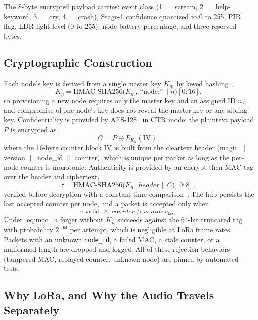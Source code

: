 \documentclass[journal]{IEEEtran}
\begin{document}
The 8-byte encrypted payload carries: event class (1~=~scream,
2~=~help-keyword, 3~=~cry, 4~=~crash), Stage-1 confidence quantized to
0 to 255, PIR flag, LDR light level (0 to 255), node battery percentage, and
three reserved bytes.

\subsection{Cryptographic Construction}

Each node's key is derived from a single master key $K_m$ by keyed
hashing~\cite{rfc2104},
\begin{equation}
\label{eq:keyderivation}
K_n = \mathrm{HMAC\text{-}SHA256}\bigl(K_m,\ \text{``node:''} \parallel
n\bigr)[0{:}16],
\end{equation}
so provisioning a new node requires only the master key and an assigned ID
$n$, and compromise of one node's key does not reveal the master key or any
sibling key. Confidentiality is provided by AES-128~\cite{fips197} in CTR
mode: the plaintext payload $P$ is encrypted as
\begin{equation}
\label{eq:ctr}
C = P \oplus E_{K_n}(\mathrm{IV}),
\end{equation}
where the 16-byte counter block IV is built from the cleartext header
(magic $\parallel$ version $\parallel$ node\_id $\parallel$ counter), which
is unique per packet as long as the per-node counter is monotonic.
Authenticity is provided by an encrypt-then-MAC tag over the header and
ciphertext,
\begin{equation}
\label{eq:mac}
\tau = \mathrm{HMAC\text{-}SHA256}\bigl(K_n,\ \mathit{header} \parallel
C\bigr)[0{:}8],
\end{equation}
verified before decryption with a constant-time
comparison~\cite{rfc2104}. The hub persists the last accepted counter per
node, and a packet is accepted only when
\begin{equation}
\label{eq:accept}
\tau\ \text{valid} \;\wedge\; \mathit{counter} >
\mathit{counter}_{\mathrm{last}}.
\end{equation}
Under \eqref{eq:mac}, a forger without $K_n$ succeeds against the 64-bit
truncated tag with probability $2^{-64}$ per attempt, which is negligible at
LoRa frame rates. Packets with an unknown \texttt{node\_id}, a failed MAC, a
stale counter, or a malformed length are dropped and logged. All of these
rejection behaviors (tampered MAC, replayed counter, unknown node) are
pinned by automated tests.

\subsection{Why LoRa, and Why the Audio Travels Separately}
\end{document}
